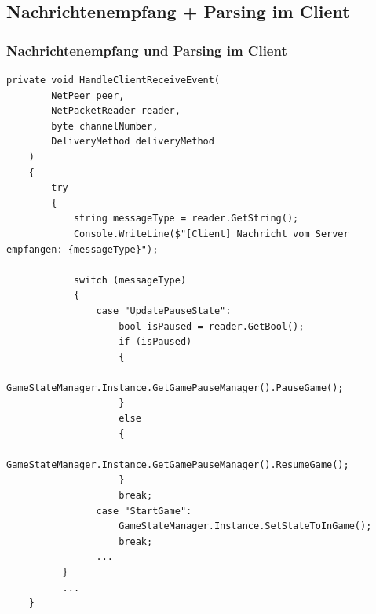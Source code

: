 \documentclass{beamer}
\begin{document}
\subsection{Nachrichtenempfang + Parsing im Client}
\begin{frame}[fragile]
\frametitle{Nachrichtenempfang und Parsing im Client}
  \begin{lstlisting}[language=CSharp, basicstyle=\ttfamily\tiny, breaklines=true]
     private void HandleClientReceiveEvent(
        NetPeer peer,
        NetPacketReader reader,
        byte channelNumber,
        DeliveryMethod deliveryMethod
    )
    {
        try
        {
            string messageType = reader.GetString();
            Console.WriteLine($"[Client] Nachricht vom Server empfangen: {messageType}");

            switch (messageType)
            {
                case "UpdatePauseState":
                    bool isPaused = reader.GetBool();
                    if (isPaused)
                    {
                        GameStateManager.Instance.GetGamePauseManager().PauseGame();
                    }
                    else
                    {
                        GameStateManager.Instance.GetGamePauseManager().ResumeGame();
                    }
                    break;
                case "StartGame":
                    GameStateManager.Instance.SetStateToInGame();
                    break;
                ...
          }
          ...
    }
  \end{lstlisting}
\end{frame}
\end{document}
